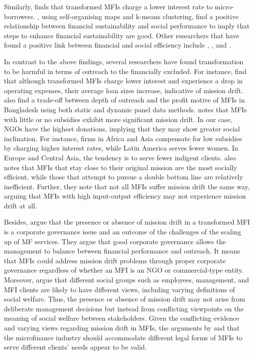 \documentclass[a4paper, nobind]{templates/ociamthesis}
\begin{document}
Similarly, \textcite{d2017ngos} finds that transformed MFIs charge a lower interest rate to micro-borrowers. \textcite{louis2013financial}, using self-organising maps and k-means clustering, find a positive relationship between financial sustainability and social performance to imply that steps to enhance financial sustainability are good. Other researchers that have found a positive link between financial and social efficiency include \textcite{gutierrez2009social}, \textcite{mersland2010microfinance}, and \textcite{quayes2012depth}.

In contrast to the above findings, several researchers have found transformation to be harmful in terms of outreach to the financially excluded. For instance, \textcite{d2017ngos} find that although transformed MFIs charge lower interest and experience a drop in operating expenses, their average loan sizes increase, indicative of mission drift. \textcite{mia2017mission} also find a trade-off between depth of outreach and the profit motive of MFIs in Bangladesh using both static and dynamic panel data methods. \textcite{d2013unsubsidized} notes that MFIs with little or no subsidies exhibit more significant mission drift. In our case, NGOs have the highest donations, implying that they may show greater social inclination. For instance, firms in Africa and Asia compensate for low subsidies by charging higher interest rates, while Latin America serves fewer women. In Europe and Central Asia, the tendency is to serve fewer indigent clients. \textcite{bos2015practice} also notes that MFIs that stay close to their original mission are the most socially efficient, while those that attempt to pursue a double bottom line are relatively inefficient. Further, they note that not all MFIs suffer mission drift the same way, arguing that MFIs with high input-output efficiency may not experience mission drift at all.

Besides, \textcite{campion1999institutional} argue that the presence or absence of mission drift in a transformed MFI is a corporate governance issue and an outcome of the challenges of the scaling up of MF services. They argue that good corporate governance allows the management to balance between financial performance and outreach. It means that MFIs could address mission drift problems through proper corporate governance regardless of whether an MFI is an NGO or commercial-type entity. Moreover, \textcite{marti2016financial} argue that different social groups such as employees, management, and MFI clients are likely to have different views, including varying definitions of social welfare. Thus, the presence or absence of mission drift may not arise from deliberate management decisions but instead from conflicting viewpoints on the meaning of social welfare between stakeholders. Given the conflicting evidence and varying views regarding mission drift in MFIs, the arguments by \textcite{morduch1999microfinance} and \textcite{morduch2000microfinance} that the microfinance industry should accommodate different legal forms of MFIs to serve different clients' needs appear to be valid.
\end{document}
